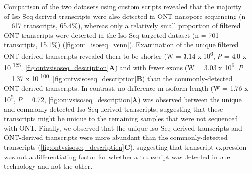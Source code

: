 Comparison of the two datasets using custom scripts revealed that the majority of Iso-Seq-derived transcripts were also detected in ONT nanopore sequencing (n = 617 transcripts, 65.4\%), whereas only a relatively small proportion of filtered ONT-transcripts were detected in the Iso-Seq targeted dataset (n = 701 transcripts, 15.1\%) (\cref{fig:ont_isoseq_venn}). Examination of the unique filtered ONT-derived transcripts revealed them to be shorter (W = 3.14 x 10\textsuperscript{6}, \textit{P} = 4.0 x 10\textsuperscript{-125}, \cref{fig:ontvsisoseq_description}\textbf{A}) and with fewer exons (W = 3.03 x 10\textsuperscript{6}, \textit{P} = 1.37 x 10\textsuperscript{-100}, \cref{fig:ontvsisoseq_description}\textbf{B}) than the commonly-detected ONT-derived transcripts. In contrast, no difference in isoform length (W = 1.76 x 10\textsuperscript{5}, \textit{P} = 0.72, \cref{fig:ontvsisoseq_description}\textbf{A}) was observed between the unique and commonly-detected Iso-Seq derived transcripts, suggesting that these transcripts might be unique to the remaining samples that were not sequenced with ONT. Finally, we observed that the unique Iso-Seq-derived transcripts and ONT-derived transcripts were more abundant than the commonly-detected transcripts (\cref{fig:ontvsisoseq_description}\textbf{C}), suggesting that transcript expression was not a differentiating factor for whether a transcript was detected in one technology and not the other. 

